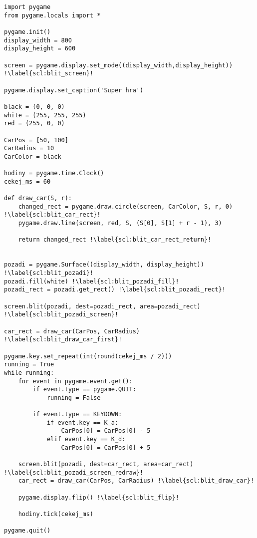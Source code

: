 \begin{minipage}[t]{.45\textwidth}
\begin{code}
\begin{verbatim}
import pygame
from pygame.locals import *

pygame.init()
display_width = 800
display_height = 600

screen = pygame.display.set_mode((display_width,display_height)) !\label{scl:blit_screen}!

pygame.display.set_caption('Super hra')

black = (0, 0, 0)
white = (255, 255, 255)
red = (255, 0, 0)

CarPos = [50, 100]
CarRadius = 10
CarColor = black

hodiny = pygame.time.Clock()
cekej_ms = 60

def draw_car(S, r):
    changed_rect = pygame.draw.circle(screen, CarColor, S, r, 0) !\label{scl:blit_car_rect}!
    pygame.draw.line(screen, red, S, (S[0], S[1] + r - 1), 3)
    
    return changed_rect !\label{scl:blit_car_rect_return}!


pozadi = pygame.Surface((display_width, display_height)) !\label{scl:blit_pozadi}!
pozadi.fill(white) !\label{scl:blit_pozadi_fill}!
pozadi_rect = pozadi.get_rect() !\label{scl:blit_pozadi_rect}!

screen.blit(pozadi, dest=pozadi_rect, area=pozadi_rect) !\label{scl:blit_pozadi_screen}!

car_rect = draw_car(CarPos, CarRadius) !\label{scl:blit_draw_car_first}!

pygame.key.set_repeat(int(round(cekej_ms / 2)))
running = True
while running:
    for event in pygame.event.get(): 
        if event.type == pygame.QUIT:
            running = False

        if event.type == KEYDOWN:
            if event.key == K_a:
                CarPos[0] = CarPos[0] - 5
            elif event.key == K_d:
                CarPos[0] = CarPos[0] + 5

    screen.blit(pozadi, dest=car_rect, area=car_rect) !\label{scl:blit_pozadi_screen_redraw}!
    car_rect = draw_car(CarPos, CarRadius) !\label{scl:blit_draw_car}!
 
    pygame.display.flip() !\label{scl:blit_flip}!
    
    hodiny.tick(cekej_ms)

pygame.quit()
\end{verbatim}

\label{code:grafika_blit}
\end{code}
\end{minipage}
